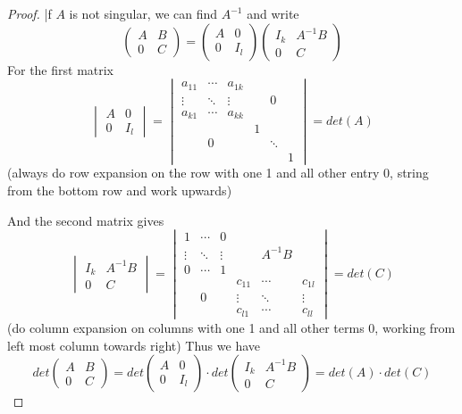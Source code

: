 \documentclass{article}
\begin{document}
\begin{proof}
|f $A$ is not singular, we can find $A^{-1}$ and write $$\begin{pmatrix} A & B \\ 0 & C \end{pmatrix} = \begin{pmatrix} A & 0 \\ 0& I_l \end{pmatrix} \begin{pmatrix} I_k & A^{-1}B \\ 0 & C \end{pmatrix}$$ 
For the first matrix
$$
\begin{vmatrix} A & 0 \\ 0& I_l \end{vmatrix} = \begin{vmatrix}  a_{11} & \cdots & a_{1k} \\ \vdots & \ddots & \vdots && 0 \\ a_{k1} & \cdots & a_{kk} \\& & & 1 \\ &0 & & & \ddots \\ & & & && 1\end{vmatrix} = det(A)
$$(always do row expansion on the row with one 1 and all other entry 0, string from the bottom row and work upwards)

And the second matrix gives 
$$
\begin{vmatrix} I_k & A^{-1}B \\ 0 & C \end{vmatrix} = \begin{vmatrix} 1 & \cdots & 0 \\ \vdots & \ddots & \vdots & &A^{-1}B\\ 0 & \cdots & 1   \\ & & & c_{11} & \cdots & c_{1l} \\ &0&& \vdots & \ddots & \vdots \\ &&& c_{l1} & \cdots & c_{ll} \end{vmatrix} = det(C)
$$ (do column expansion on columns with one 1 and all other terms 0, working from left most column towards right)
Thus we have 
$$det\begin{pmatrix} A & B \\ 0 & C \end{pmatrix} = det\begin{pmatrix} A & 0 \\ 0& I_l \end{pmatrix} \cdot det\begin{pmatrix} I_k & A^{-1}B \\ 0 & C \end{pmatrix} = det(A) \cdot det(C)$$ 

 \end{proof}
\newpage
\end{document}
